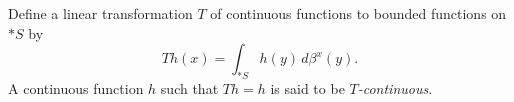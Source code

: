 Define a linear transformation $T$ of continuous functions to bounded functions on $*S$ by
$$
Th(x) = \int_{*S} h(y)\,d\beta^x(y).
$$
A continuous function $h$ such that $Th = h$ is said to be \emph{$T$-continuous}.
